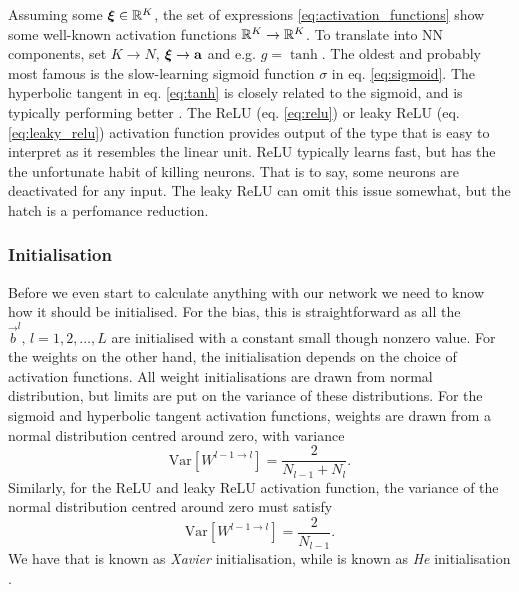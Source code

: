 
    Assuming some $\svec{\xi} \in \RR[K]$, the set of expressions \eqref{eq:activation_functions} show some well-known activation functions $\RR[K] \to \RR[K]$. To translate into NN components, set $K\to N$, $\svec{\xi} \to \vec{a}$ and e.g. $g = \tanh$. 
    The oldest and probably most famous is the slow-learning sigmoid function $\sigma$ in eq. \eqref{eq:sigmoid}. The hyperbolic tangent in eq. \eqref{eq:tanh} is closely related to the sigmoid, and is typically performing better \citep{Goodfellow2016}. The ReLU (eq. \eqref{eq:relu}) or leaky ReLU (eq. \eqref{eq:leaky_relu}) activation function provides output of the type that is easy to interpret as it resembles the linear unit. ReLU typically learns fast, but has the the unfortunate habit of killing neurons. That is to say, some neurons are deactivated for any input. The leaky ReLU can omit this issue somewhat, but the hatch is a perfomance reduction.


    \subsubsection{Initialisation}\label{sec:initialisation}
    Before we even start to calculate anything with our network we need to know how it should be initialised. For the bias, this is straightforward as all the $\vec{b}^l, \, l=1,2,\dots,L$ are initialised with a constant small though nonzero value. For the weights on the other hand, the initialisation depends on the choice of activation functions. All weight initialisations are drawn from normal distribution, but limits are put on the variance of these distributions. For the sigmoid and hyperbolic tangent activation functions, weights are drawn from a normal distribution centred around zero, with variance
    \begin{equation}\label{eq:init_xavier}
        \mathrm{Var}\left[W^{l-1\!\to l}\right] = \frac{2}{N_{l-1}+N_l}.
    \end{equation}
    Similarly, for the ReLU and leaky ReLU activation function, the variance of the normal distribution centred around zero must satisfy
    \begin{equation}\label{eq:init_he}
        \mathrm{Var}\left[W^{l-1\!\to l}\right] = \frac{2}{N_{l-1}}.
    \end{equation}
    We have that  is known as \textit{Xavier} initialisation, while  is known as \textit{He} initialisation \citep{Goodfellow2016}.

